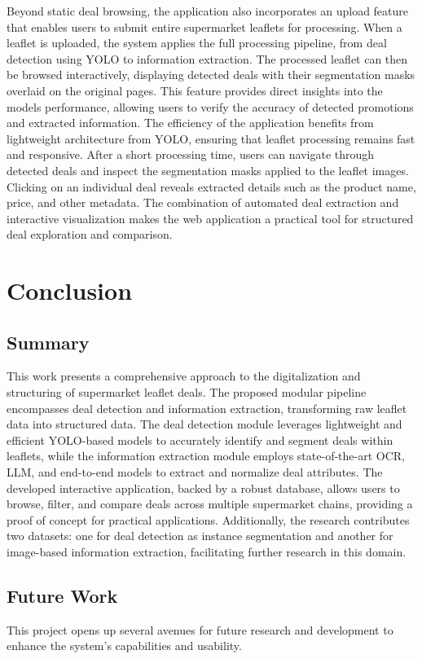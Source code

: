 \documentclass[11pt]{article}
\begin{document}
Beyond static deal browsing, the application also incorporates an upload feature that enables users to submit entire supermarket leaflets for processing. When a leaflet is uploaded, the system applies the full processing pipeline, from deal detection using YOLO to information extraction. The processed leaflet can then be browsed interactively, displaying detected deals with their segmentation masks overlaid on the original pages. This feature provides direct insights into the models performance, allowing users to verify the accuracy of detected promotions and extracted information. The efficiency of the application benefits from  lightweight architecture from YOLO, ensuring that leaflet processing remains fast and responsive. After a short processing time, users can navigate through detected deals and inspect the segmentation masks applied to the leaflet images. Clicking on an individual deal reveals extracted details such as the product name, price, and other metadata. The combination of automated deal extraction and interactive visualization makes the web application a practical tool for structured deal exploration and comparison.

\section{Conclusion}
\label{sec:conclusion}
    \subsection{Summary}
    This work presents a comprehensive approach to the digitalization and structuring of supermarket leaflet deals. The proposed modular pipeline encompasses deal detection and information extraction, transforming raw leaflet data into structured data. The deal detection module leverages lightweight and efficient YOLO-based models to accurately identify and segment deals within leaflets, while the information extraction module employs state-of-the-art OCR, LLM, and end-to-end models to extract and normalize deal attributes. The developed interactive application, backed by a robust database, allows users to browse, filter, and compare deals across multiple supermarket chains, providing a proof of concept for practical applications. Additionally, the research contributes two datasets: one for deal detection as instance segmentation and another for image-based information extraction, facilitating further research in this domain.

    \subsection{Future Work}
    This project opens up several avenues for future research and development to enhance the system's capabilities and usability.
\end{document}
